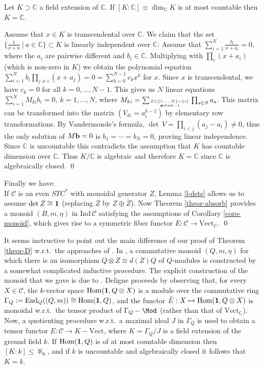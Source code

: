 \documentclass[12pt]{article}
\theoremstyle{definition}
\theoremstyle{definition}
\theoremstyle{remark}
\newcommand{\Vect}{\mathrm{Vect}}
\def\2#1{{\mathcal #1}}
\def\7#1{{\mathbb #1}}
\def\1#1{{\bf #1}}
\def\ol#1{{\overline #1}}
\newcommand{\Hom}{\mathrm{Hom}}
\newcommand{\End}{\mathrm{End}}
\newcommand{\rarr}{\rightarrow}
\begin{document}
\blemma \label{lem-extC} 
Let $K\supset\7C$ a field extension of $\7C$. If $[K:\7C]\equiv\dim_\7CK$ is at most countable then
$K=\7C$.
\elemma

\prf Assume that $x\in K$ is transcendental over $\7C$. We claim that the set 
$\{ \frac{1}{x+a}\ | \ a\in\7C\}\subset K$ is linearly independent over $\7C$: Assume that
$\sum_{i=1}^N \frac{b_i}{x+a_i}=0$, where  the $a_i$ are pairwise different and $b_i\in\7C$.  
Multiplying with $\prod_i(x+a_i)$ (which is non-zero in $K$) we obtain the polynomial equation
$\sum_{i=1}^N b_i\prod_{j\ne i}(x+a_j)=0=\sum_{k=0}^{N-1}c_kx^k$ for $x$. Since $x$ is
transcendental, we have $c_k=0$ for all $k=0,\ldots,N-1$. This gives us $N$ linear equations
$\sum_{i=1}^N M_{ki}b_i=0,\ k=1,\ldots,N$, where
$M_{ki}= \sum_{S\subset\{1,\ldots,N\}-\{i\} \atop \# S={k-1}} \prod_{s\in S}a_s$. This matrix can be
transformed into the matrix $(V_{ki}=a_i^{k-1})$ by elementary row transformations. By Vandermonde's
formula, $\det\,V=\prod_{i<j}(a_j-a_i)\ne 0$, thus the only solution of $M{\bf b}=0$ is
$b_1=\cdots=b_N=0$, proving linear independence. Since $\7C$ is uncountable this contradicts the
assumption that $K$ has countable dimension over $\7C$. Thus $K/\7C$ is algebraic and therefore
$K=\7C$ since $\7C$ is algebraically closed.  
\qed

Finally we have: \\

 If $\2C$ is an even $STC^*$ with monoidal generator
$Z$, Lemma \ref{l-dets} allows us to assume $\det Z\cong\11$ (replacing $Z$ by $Z\oplus\ol{Z}$). Now
Theorem \ref{theor-absorb} provides a monoid $(B,m,\eta)$ in $\mathrm{Ind}\,\2C$ satisfying the
assumptions of Corollary \ref{coro-monoid}, which gives rise to a symmetric fiber functor
$E:\2C\rarr\Vect_\7C$. 
\qed

\brem \label{rem-new} 
It seems instructive to point out the main difference of our proof of Theorem \ref{theor-D} w.r.t.\
the approaches of \cite{del,bichon}. In \cite{del}, a commutative monoid $(Q,m,\eta)$ for which
there is an isomorphism $Q\otimes Z\cong d(Z)Q$ of $Q$-modules is constructed by a somewhat
complicated inductive procedure. The explicit construction of the monoid that we gave is due to
\cite{bichon}. Deligne proceeds by observing that, for every $X\in\2C$, the $k$-vector space
$\Hom(\11,Q\otimes X)$ is a module over the commutative ring
$\Gamma_Q:=\End_Q((Q,m))\cong\Hom(\11,Q)$, and the functor $\tilde{E}: X\mapsto\Hom(\11,Q\otimes X)$
is monoidal w.r.t.\ the tensor product of $\Gamma_Q-\Mod$ (rather than that of $\Vect_\7C$). 
Now, a quotienting procedure w.r.t.\ a maximal ideal $J$ in $\Gamma_Q$ is used to obtain a tensor
functor $E: \2C\rarr K-\Vect$, where $K=\Gamma_Q/J$ is a field extension of the ground field $k$. If
$\Hom(\11,Q)$ is of at most countable dimension then $[K:k]\le\aleph_0$, and if $k$ is uncountable
and algebraically closed it follows that $K=k$.  
\end{document}

